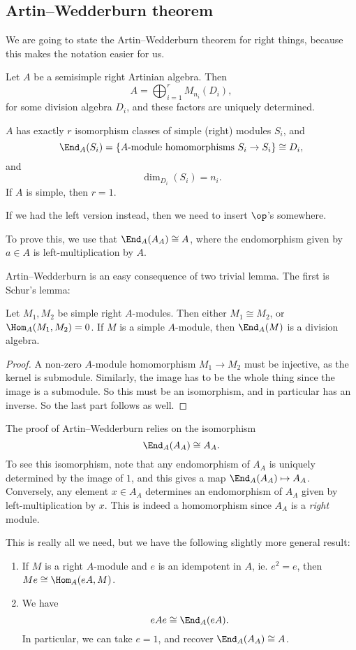 \documentclass[a4paper]{article}
\begin{document}
\subsection{Artin--Wedderburn theorem}
We are going to state the Artin--Wedderburn theorem for right things, because this makes the notation easier for us.
\begin{thm}
  Let $A$ be a semisimple right Artinian algebra. Then
  \[
    A = \bigoplus_{i = 1}^r M_{n_i}(D_i),
  \]
  for some division algebra $D_i$, and these factors are uniquely determined.

  $A$ has exactly $r$ isomorphism classes of simple (right) modules $S_i$, and
  \[
    \End_A (S_i) = \{\text{$A$-module homomorphisms $S_i \to S_i$}\} \cong D_i,
  \]
  and
  \[
    \dim_{D_i}(S_i) = n_i.
  \]
  If $A$ is simple, then $r = 1$.
\end{thm}
If we had the left version instead, then we need to insert $\op$'s somewhere.

To prove this, we use that $\End_A(A_A) \cong A$, where the endomorphism given by $a \in A$ is left-multiplication by $A$.

Artin--Wedderburn is an easy consequence of two trivial lemma. The first is Schur's lemma:
\begin{lemma}
  Let $M_1, M_2$ be simple right $A$-modules. Then either $M_1 \cong M_2$, or $\Hom_A(M_1, M_2) = 0$. If $M$ is a simple $A$-module, then $\End_A(M)$ is a division algebra.
\end{lemma}

\begin{proof}
  A non-zero $A$-module homomorphism $M_1 \to M_2$ must be injective, as the kernel is submodule. Similarly, the image has to be the whole thing since the image is a submodule. So this must be an isomorphism, and in particular has an inverse. So the last part follows as well.
\end{proof}

The proof of Artin--Wedderburn relies on the isomorphism
\[
  \End_A(A_A) \cong A_A.
\]
To see this isomorphism, note that any endomorphism of $A_A$ is uniquely determined by the image of $1$, and this gives a map $\End_A(A_A) \mapsto A_A$. Conversely, any element $x \in A_A$ determines an endomorphism of $A_A$ given by left-multiplication by $x$. This is indeed a homomorphism since $A_A$ is a \emph{right} module.

This is really all we need, but we have the following slightly more general result:
\begin{lemma}\leavevmode
  \begin{enumerate}
    \item If $M$ is a right $A$-module and $e$ is an idempotent in $A$, ie. $e^2 = e$, then $Me \cong \Hom_A(eA, M)$.
    \item We have
      \[
        eAe \cong \End_A(eA).
      \]
      In particular, we can take $e = 1$, and recover $\End_A(A_A) \cong A$.
  \end{enumerate}
\end{lemma}
\end{document}
